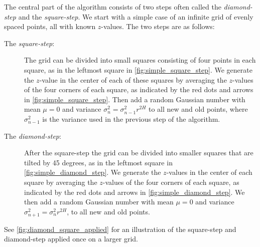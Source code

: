 The central part of the algorithm consists of two steps often called the \emph{diamond-step} and the \emph{square-step}. We start with a simple case of an infinite grid of evenly spaced points, all with known $z$-values. The two steps are as follows:
\begin{description}
    \item[The \emph{square-step}:] The grid can be divided into small squares consisting of four points in each square, as in the leftmost square in \cref{fig:simple_square_step}. We generate the $z$-value in the center of each of these squares by averaging the $z$-values of the four corners of each square, as indicated by the red dots and arrows in \cref{fig:simple_square_step}. Then add a random Gaussian number with mean $\mu = 0$ and variance $\sigma_n^2 = \sigma_{n-1}^2r^{2H}$ to all new and old points, where $\sigma_{n-1}^2$ is the variance used in the previous step of the algorithm.
    \label{enum:test}
    
    \item[The \emph{diamond-step}:] After the square-step the grid can be divided into smaller squares that are tilted by 45 degrees, as in the leftmost square in \cref{fig:simple_diamond_step}. We generate the $z$-values in the center of each square by averaging the $z$-values of the four corners of each square, as indicated by the red dots and arrows in \cref{fig:simple_diamond_step}. We then add a random Gaussian number with mean $\mu = 0$ and variance $\sigma_{n+1}^2 = \sigma_n^2r^{2H}$, to all new and old points. 
\end{description}
See \cref{fig:diamond_square_applied} for an illustration of the square-step and diamond-step applied once on a larger grid. 


